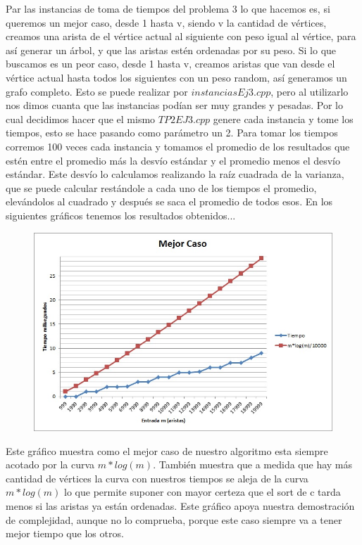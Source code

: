 Par las instancias de toma de tiempos del problema 3 lo que hacemos es, si queremos un mejor caso, desde 1 hasta v, siendo v la cantidad de vértices, creamos una arista de el vértice actual al siguiente con peso igual al vértice, para así generar un árbol, y que las aristas estén ordenadas por su peso. Si lo que buscamos es un peor caso, desde 1 hasta v, creamos aristas que van desde el vértice actual hasta todos los siguientes con un peso random, así generamos un grafo completo. Esto se puede realizar por $instanciasEj3.cpp$, pero al utilizarlo nos dimos cuanta que las instancias podían ser muy grandes y pesadas. Por lo cual decidimos hacer que el mismo $TP2EJ3.cpp$ genere cada instancia y tome los tiempos, esto se hace pasando como parámetro un 2.\newline
Para tomar los tiempos corremos 100 veces cada instancia y tomamos el promedio de los resultados que estén entre el promedio más la desvío estándar y el promedio menos el desvío estándar. Este desvío lo calculamos realizando la raíz cuadrada de la varianza, que se puede calcular restándole a cada uno de los tiempos el promedio, elevándolos al cuadrado y después se saca el promedio de todos esos.
\newline\newline
En los siguientes gráficos tenemos los resultados obtenidos...

\begin{figure}[H]
  \begin{center}
      \includegraphics[scale=0.70]{../MejorCasoEj3.jpg}
  \end{center}
 \end{figure}

Este gráfico muestra como el mejor caso de nuestro algoritmo esta siempre acotado por la curva $m*log(m)$. También muestra que a medida que hay más cantidad de vértices la curva con nuestros tiempos se aleja de la curva $m*log(m)$ lo que permite suponer con mayor certeza que el sort de c tarda menos si las aristas ya están ordenadas. Este gráfico apoya nuestra demostración de complejidad, aunque no lo comprueba, porque este caso siempre va a tener mejor tiempo que los otros.

